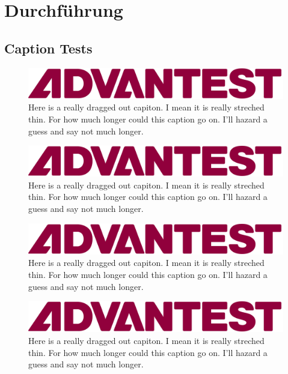 \chapter{Durchführung}
\section{Caption Tests}
\begin{figure}[htbp!]
    \centering
    \includegraphics{img/advantest-logo.png}
    \caption{Here is a really dragged out capiton. I mean it is really streched thin. For how much longer could this caption go on. I'll hazard a guess and say not much longer.}
    \label{fig1}
\end{figure}

\captionsetup[figure]{format=hang, justification=raggedright, labelsep=colon, labelfont=normal}

\begin{figure}[htbp!]
    \centering
    \includegraphics{img/advantest-logo.png}
    \caption{Here is a really dragged out capiton. I mean it is really streched thin. For how much longer could this caption go on. I'll hazard a guess and say not much longer.}
    \label{fig2}
\end{figure}

\captionsetup[figure]{justification=justified}

\begin{figure}[htbp!]
    \centering
    \includegraphics{img/advantest-logo.png}
    \caption{Here is a really dragged out capiton. I mean it is really streched thin. For how much longer could this caption go on. I'll hazard a guess and say not much longer.}
    \label{fig3}
\end{figure}

\captionsetup[figure]{justification=centering}

\begin{figure}[htbp!]
    \centering
    \includegraphics{img/advantest-logo.png}
    \caption{Here is a really dragged out capiton. I mean it is really streched thin. For how much longer could this caption go on. I'll hazard a guess and say not much longer.}
    \label{fig4}
\end{figure}


